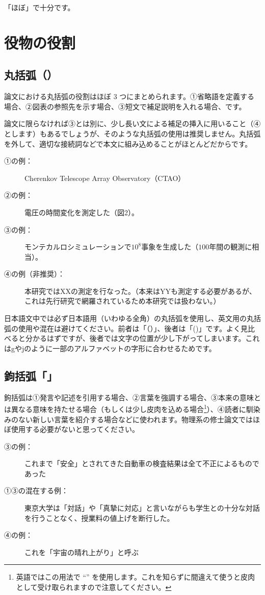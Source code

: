 「ほぼ」で十分です。

\section{役物の役割}

\subsection{丸括弧（）}

論文における丸括弧の役割はほぼ 3 つにまとめられます。①省略語を定義する場合、②図表の参照先を示す場合、③短文で補足説明を入れる場合、です。

論文に限らなければ③とは別に、少し長い文による補足の挿入に用いること（④とします）もあるでしょうが、そのような丸括弧の使用は推奨しません。丸括弧を外して、適切な接続詞などで本文に組み込めることがほとんどだからです。

\begin{description}
\item[①の例：]Cherenkov Telescope Array Observatory（CTAO）
\item[②の例：]電圧の時間変化を測定した（図2）。
\item[③の例：]モンテカルロシミュレーションで$10^8$事象を生成した（$100$年間の観測に相当）。
\item[④の例（非推奨）：]本研究ではXXの測定を行なった。（本来はYYも測定する必要があるが、これは先行研究で網羅されているため本研究では扱わない。）
\end{description}

日本語文中では必ず日本語用（いわゆる全角）の丸括弧を使用し、英文用の丸括弧の使用や混在は避けてください。前者は「（）」、後者は「()」です。よく見比べると分かるはずですが、後者では文字の位置が少し下がってしまいます。これはgやjのように一部のアルファベットの字形に合わせるためです。


\subsection{鉤括弧「」}

鉤括弧は①発言や記述を引用する場合、②言葉を強調する場合、③本来の意味とは異なる意味を持たせる場合（もしくは少し皮肉を込める場合\footnote{英語ではこの用法で ``'' を使用します。これを知らずに間違えて使うと皮肉として受け取られますので注意してください。}）、④読者に馴染みのない新しい言葉を紹介する場合などに使われます。物理系の修士論文ではほぼ使用する必要がないと思ってください。

\begin{description}
\item[③の例：]これまで「安全」とされてきた自動車の検査結果は全て不正によるものであった
\item[①③の混在する例：]東京大学は「対話」や「真摯に対応」と言いながらも学生との十分な対話を行うことなく、授業料の値上げを断行した。
\item[④の例：]これを「宇宙の晴れ上がり」と呼ぶ
\end{description}

